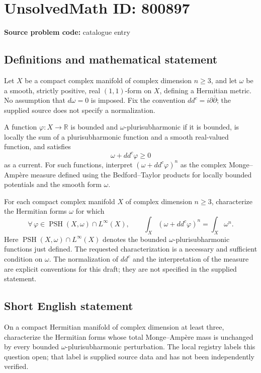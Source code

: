 \documentclass[11pt]{article}
\newcommand{\R}{\mathbb{R}}
\begin{document}
\section*{UnsolvedMath ID: 800897}
\textbf{Source problem code:} catalogue entry
\subsection{Definitions and mathematical statement}
Let \(X\) be a compact complex manifold of complex dimension \(n\geq 3\), and let \(\omega\) be a smooth, strictly positive, real \((1,1)\)-form on \(X\), defining a Hermitian metric. No assumption that \(d\omega=0\) is imposed. Fix the convention \(dd^c=i\partial\bar\partial\); the supplied source does not specify a normalization.

A function \(\varphi:X\to\R\) is bounded and \(\omega\)-plurisubharmonic if it is bounded, is locally the sum of a plurisubharmonic function and a smooth real-valued function, and satisfies
\[
\omega+dd^c\varphi\geq 0
\]
as a current. For such functions, interpret \((\omega+dd^c\varphi)^n\) as the complex Monge--Amp\`ere measure defined using the Bedford--Taylor products for locally bounded potentials and the smooth form \(\omega\).

For each compact complex manifold \(X\) of complex dimension \(n\geq 3\), characterize the Hermitian forms \(\omega\) for which
\[
\forall\,\varphi\in\operatorname{PSH}(X,\omega)\cap L^\infty(X),\qquad
\int_X(\omega+dd^c\varphi)^n=\int_X\omega^n.
\]
Here \(\operatorname{PSH}(X,\omega)\cap L^\infty(X)\) denotes the bounded \(\omega\)-plurisubharmonic functions just defined. The requested characterization is a necessary and sufficient condition on \(\omega\). The normalization of \(dd^c\) and the interpretation of the measure are explicit conventions for this draft; they are not specified in the supplied statement.
\subsection{Short English statement}
On a compact Hermitian manifold of complex dimension at least three, characterize the Hermitian forms whose total Monge--Amp\`ere mass is unchanged by every bounded \(\omega\)-plurisubharmonic perturbation. The local registry labels this question open; that label is supplied source data and has not been independently verified.
\end{document}
